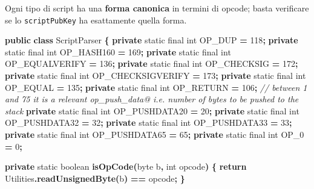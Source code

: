 \documentclass[
  italian,
  openany]{book}
\newenvironment{Shaded}{\begin{snugshade}}{\end{snugshade}}
\newcommand{\BuiltInTok}[1]{#1}
\newcommand{\CommentTok}[1]{\textcolor[rgb]{0.56,0.35,0.01}{\textit{#1}}}
\newcommand{\ControlFlowTok}[1]{\textcolor[rgb]{0.13,0.29,0.53}{\textbf{#1}}}
\newcommand{\DataTypeTok}[1]{\textcolor[rgb]{0.13,0.29,0.53}{#1}}
\newcommand{\DecValTok}[1]{\textcolor[rgb]{0.00,0.00,0.81}{#1}}
\newcommand{\FunctionTok}[1]{\textcolor[rgb]{0.13,0.29,0.53}{\textbf{#1}}}
\newcommand{\KeywordTok}[1]{\textcolor[rgb]{0.13,0.29,0.53}{\textbf{#1}}}
\newcommand{\NormalTok}[1]{#1}
\newcommand{\OperatorTok}[1]{\textcolor[rgb]{0.81,0.36,0.00}{\textbf{#1}}}
\begin{document}
Ogni tipo di script ha una \textbf{forma canonica} in termini di opcode;
basta verificare se lo \texttt{scriptPubKey} ha esattamente quella
forma.

\begin{Shaded}
\begin{Highlighting}[]
\KeywordTok{public} \KeywordTok{class}\NormalTok{ ScriptParser }\OperatorTok{\{}
    \KeywordTok{private} \DataTypeTok{static} \DataTypeTok{final} \DataTypeTok{int}\NormalTok{ OP\_DUP           }\OperatorTok{=} \DecValTok{118}\OperatorTok{;}
    \KeywordTok{private} \DataTypeTok{static} \DataTypeTok{final} \DataTypeTok{int}\NormalTok{ OP\_HASH160       }\OperatorTok{=} \DecValTok{169}\OperatorTok{;}
    \KeywordTok{private} \DataTypeTok{static} \DataTypeTok{final} \DataTypeTok{int}\NormalTok{ OP\_EQUALVERIFY   }\OperatorTok{=} \DecValTok{136}\OperatorTok{;}
    \KeywordTok{private} \DataTypeTok{static} \DataTypeTok{final} \DataTypeTok{int}\NormalTok{ OP\_CHECKSIG      }\OperatorTok{=} \DecValTok{172}\OperatorTok{;}
    \KeywordTok{private} \DataTypeTok{static} \DataTypeTok{final} \DataTypeTok{int}\NormalTok{ OP\_CHECKSIGVERIFY }\OperatorTok{=} \DecValTok{173}\OperatorTok{;}
    \KeywordTok{private} \DataTypeTok{static} \DataTypeTok{final} \DataTypeTok{int}\NormalTok{ OP\_EQUAL         }\OperatorTok{=} \DecValTok{135}\OperatorTok{;}
    \KeywordTok{private} \DataTypeTok{static} \DataTypeTok{final} \DataTypeTok{int}\NormalTok{ OP\_RETURN        }\OperatorTok{=} \DecValTok{106}\OperatorTok{;}
    \CommentTok{// between 1 and 75 it is a relevant op\_push\_data@ i.e. number of bytes to be pushed to the stack}
    \KeywordTok{private} \DataTypeTok{static} \DataTypeTok{final} \DataTypeTok{int}\NormalTok{ OP\_PUSHDATA20 }\OperatorTok{=} \DecValTok{20}\OperatorTok{;}
    \KeywordTok{private} \DataTypeTok{static} \DataTypeTok{final} \DataTypeTok{int}\NormalTok{ OP\_PUSHDATA32 }\OperatorTok{=} \DecValTok{32}\OperatorTok{;}
    \KeywordTok{private} \DataTypeTok{static} \DataTypeTok{final} \DataTypeTok{int}\NormalTok{ OP\_PUSHDATA33 }\OperatorTok{=} \DecValTok{33}\OperatorTok{;}
    \KeywordTok{private} \DataTypeTok{static} \DataTypeTok{final} \DataTypeTok{int}\NormalTok{ OP\_PUSHDATA65 }\OperatorTok{=} \DecValTok{65}\OperatorTok{;}
    \KeywordTok{private} \DataTypeTok{static} \DataTypeTok{final} \DataTypeTok{int}\NormalTok{ OP\_0 }\OperatorTok{=} \DecValTok{0}\OperatorTok{;}

    \KeywordTok{private} \DataTypeTok{static} \DataTypeTok{boolean} \FunctionTok{isOpCode}\OperatorTok{(}\DataTypeTok{byte}\NormalTok{ b}\OperatorTok{,} \DataTypeTok{int}\NormalTok{ opcode}\OperatorTok{)} \OperatorTok{\{}
        \ControlFlowTok{return} \BuiltInTok{Utilities}\OperatorTok{.}\FunctionTok{readUnsignedByte}\OperatorTok{(}\NormalTok{b}\OperatorTok{)} \OperatorTok{==}\NormalTok{ opcode}\OperatorTok{;}
    \OperatorTok{\}}


\end{Highlighting}
\end{Shaded}
\end{document}
